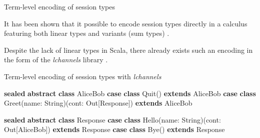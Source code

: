 \documentclass[ignorenonframetext,]{beamer}
\newenvironment{Shaded}{}{}
\newcommand{\CommentTok}[1]{\textcolor[rgb]{0.38,0.63,0.69}{\textit{#1}}}
\newcommand{\FunctionTok}[1]{\textcolor[rgb]{0.02,0.16,0.49}{#1}}
\newcommand{\KeywordTok}[1]{\textcolor[rgb]{0.00,0.44,0.13}{\textbf{#1}}}
\newcommand{\NormalTok}[1]{#1}
\newcommand{\StringTok}[1]{\textcolor[rgb]{0.25,0.44,0.63}{#1}}
\begin{document}
\begin{frame}{%
\protect\hypertarget{term-level-encoding-of-session-types}{%
Term-level encoding of session types}}

It has been shown that it possible to encode session types directly in a
calculus featuring both linear types and variants (sum types)
\cite{Wadler:2012:PS:2364527.2364568, Dardha:2012:STR:2370776.2370794}.

Despite the lack of linear types in Scala, there already exists such an
encoding in the form of the \emph{lchannels} library \cite{lchannels}.

\end{frame}

\begin{frame}[fragile]{%
\protect\hypertarget{term-level-encoding-of-session-types-with-lchannels}{%
Term-level encoding of session types with \emph{lchannels}}}

\begin{Shaded}
\begin{Highlighting}[]
\KeywordTok{sealed} \KeywordTok{abstract} \KeywordTok{class}\NormalTok{ AliceBob}
\KeywordTok{case} \KeywordTok{class} \FunctionTok{Quit}\NormalTok{() }\KeywordTok{extends}\NormalTok{ AliceBob}
\KeywordTok{case} \KeywordTok{class} \FunctionTok{Greet}\NormalTok{(name: String)(cont: Out[Response]) }\KeywordTok{extends}\NormalTok{ AliceBob}

\KeywordTok{sealed} \KeywordTok{abstract} \KeywordTok{class}\NormalTok{ Response}
\KeywordTok{case} \KeywordTok{class} \FunctionTok{Hello}\NormalTok{(name: String)(cont: Out[AliceBob]) }\KeywordTok{extends}\NormalTok{ Response}
\KeywordTok{case} \KeywordTok{class} \FunctionTok{Bye}\NormalTok{() }\KeywordTok{extends}\NormalTok{ Response}
\end{Highlighting}
\end{Shaded}

\end{frame}

\begin{frame}[fragile]

\begin{Shaded}
\end{Shaded}

\end{frame}
\end{document}

